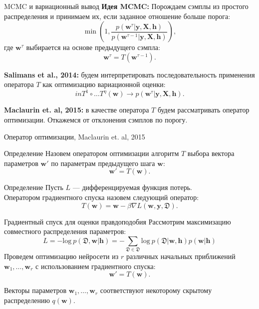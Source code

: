\documentclass[usenames,dvipsnames,10pt,pdf,utf8,russian,aspectratio=43]{beamer}
\begin{document}
\begin{frame}{MCMC и вариационный вывод}
\textbf{Идея MCMC:}
Порождаем сэмплы из простого распределения и принимаем их, если заданное отношение больше порога:
\[
    \min\left(1, \frac{p(\mathbf{w}^{\tau}|\mathbf{y}, \mathbf{X}, \mathbf{h})}{p(\mathbf{w}^{\tau - 1}|\mathbf{y}, \mathbf{X}, \mathbf{h})}\right),
\]
где $\mathbf{w}^{\tau}$ выбирается на основе предыдущего сэмпла:
\[
    \mathbf{w}^{\tau} = T(\mathbf{w}^{\tau - 1}).
\]

\textbf{Salimans et al., 2014:} будем интерпретировать последовательность применения оператора $T$ как оптимизацию вариационной оценки:
\[in
    T^1 \circ \dots T^\eta(\mathbf{w}) \to p(\mathbf{w}^{\tau}|\mathbf{y}, \mathbf{X}, \mathbf{h}).
\]

\textbf{Maclaurin et. al, 2015:}  в качестве оператора $T$ будем рассматривать оператор оптимизации. Откажемся от отклонения сэмплов по порогу.
\end{frame}


\begin{frame}{Оператор оптимизации, Maclaurin et. al, 2015}
\begin{block}{Определение}
Назовем оператором оптимизации алгоритм $T$ выбора вектора параметров $\mathbf{w}'$  по параметрам предыдущего шага $\mathbf{w}$:
\[
	\mathbf{w}' = T(\mathbf{w}).
\]
\end{block}

\begin{block}{Определение}
Пусть $L$ --- дифференцируемая функция потерь. \\
Оператором градиентного спуска назовем следующий оператор:
\[
    T(\mathbf{w}) = \mathbf{w} - \beta \nabla L(\mathbf{w}, \mathbf{y}, \mathfrak{D}).
\]
\end{block}


\end{frame}

\begin{frame}{Градиентный спуск для оценки правдоподобия}
Рассмотрим максимизацию совместного распределения параметров:
\[
    L =  -\text{log}~p(\mathfrak{D},\mathbf{w}|\mathbf{h}) = -\sum_{\mathfrak{D} \in \mathfrak{D}} \text{log}~p(\mathfrak{D}|\mathbf{w}, \mathbf{h}) p(\mathbf{w}|\mathbf{h})
\]
Проведем оптимизацию нейросети  из $r$ различных начальных приближений $\mathbf{w}_1, \dots, \mathbf{w}_r$ с использованием градиентного спуска:
\[
\mathbf{w}' = T(\mathbf{w}).
\]

Векторы параметров $\mathbf{w}_1,\dots,\mathbf{w}_r$ соответствуют некоторому скрытому распределению $q(\mathbf{w})$.

\end{frame}
\end{document}
